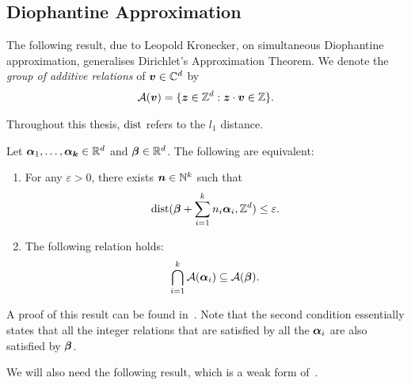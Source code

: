 \subsection{Diophantine Approximation}

The following result, due to Leopold Kronecker, on simultaneous Diophantine approximation, generalises Dirichlet's Approximation Theorem. We denote the \emph{group of additive relations} of $\boldsymbol{v} \in \mathbb{C}^{d}$ by
\begin{align*}
{\mathcal{A}}(\boldsymbol{v}) = \lbrace \boldsymbol{z} \in \mathbb{Z}^{d} : \boldsymbol{z} \cdot \boldsymbol{v} \in \mathbb{Z} \rbrace .
\end{align*}

Throughout this thesis, $\operatorname{dist}$ refers to the $l_{1}$ distance.

\begin{theorem}[Kronecker]
\label{thm:Kronecker}
Let $\boldsymbol{\alpha}_{1}, \ldots, \boldsymbol{\alpha_{k}} \in \mathbb{R}^{d}$ and $\boldsymbol{\beta} \in \mathbb{R}^{d}$. The following are equivalent:
\begin{enumerate}
\item For any $\varepsilon > 0$, there exists $\boldsymbol{n} \in \mathbb{N}^{k}$ such that
\begin{align*}
\operatorname{dist}(\boldsymbol{\beta} + \sum\limits_{i=1}^{k} n_{i} \boldsymbol{\alpha}_{i}, \mathbb{Z}^{d}) \leq \varepsilon .
\end{align*}
\item The following relation holds:
\begin{align*}
\bigcap\limits_{i=1}^{k} {\mathcal{A}}(\boldsymbol{\alpha}_{i}) \subseteq {\mathcal{A}}(\boldsymbol{\beta}) .
\end{align*}
\end{enumerate}
\end{theorem}

A proof of this result can be found in~\cite{Cassels}.
Note that the second condition essentially states that all the integer relations that are satisfied by all the $\boldsymbol{\alpha}_{i}$ are also satisfied by $\boldsymbol{\beta}$.

We will also need the following result, which is a weak form of~\cite[Corollary 2.8]{KhachiyanP97}.

